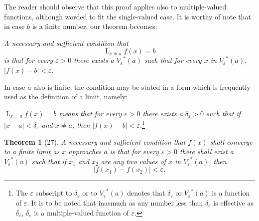 \documentclass[a4paper,12pt]{book}[2004/02/16]
\providecommand{\hypertarget}[2]{#2}
\theoremstyle{ilemma}
\theoremstyle{itheorem}
\newtheorem{theorem}{Theorem}
\theoremstyle{iother}
\theoremstyle{icorollary}
\theoremstyle{numcorollary}
\theoremstyle{idefinition}
\begin{document}
The reader should observe that this proof applies also to
multiple-valued functions, although worded to fit the single-valued
case. It is worthy of note that in case $b$ is a finite number, our
theorem becomes:

\textit{A necessary and sufficient condition that}
\[
  \mathop{L}_{x \doteq a} f(x) = b
\]
\textit{is that for every $\varepsilon>0$ there exists a
${V_\varepsilon}^*(a)$ such that for every $x$ in
${V_\varepsilon}^*(a)$, $|f(x)-b|< \varepsilon$.}

In case $a$ also is finite, the condition may be stated in a form
which is frequently used as the definition of a limit, namely:

\textit{$\displaystyle\mathop{L}_{x \doteq a} f(x) =b$ means that for
every $\varepsilon>0$ there exists a $\delta_\varepsilon >0$ such that
if $|x-a|< \delta_\varepsilon$ and $x\neq a$, then $|f(x)-b|<
\varepsilon$.}\footnote{%
  The $\varepsilon$ subscript to $\delta_\varepsilon$ or to
  ${V_\varepsilon}^*(a)$ denotes that $\delta_\varepsilon$ or
  ${V_\varepsilon}^*(a)$ is a function of $\varepsilon$. It is to be
  noted that inasmuch as any number less than $\delta_\varepsilon$ is
  effective as $\delta_\varepsilon$, $\delta_\varepsilon$ is a
  multiple-valued function of $\varepsilon$.}

\begin{theorem}[27]\hypertarget{thm27}{}
A necessary and sufficient condition that $f(x)$ shall converge to a
finite limit as $x$ approaches $a$ is that for every $\varepsilon>0$
there shall exist a ${V_\varepsilon}^*(a)$ such that if $x_1$ and
$x_2$ are any two values of $x$ in ${V_\varepsilon}^*(a)$, then
\[
  |f(x_1)-f(x_2)|< \varepsilon.
\]
\end{theorem}
\end{document}
